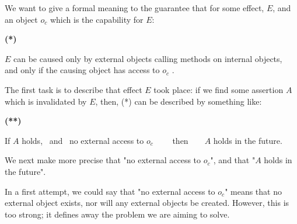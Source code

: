 We want to give a formal meaning to the guarantee that for some effect, $E$, and an object $o_c$ which is the capability for $E$:

\vspace{.1cm}

  \begin{minipage}{.05\textwidth}
   \textbf{(*)}
\end{minipage}
\hfill
\begin{minipage}{.95\textwidth}
\begin{flushleft}
$E$  can be caused only  by external objects calling methods on internal objects, \\
and only if the causing object has access  to $o_c$ . 
\end{flushleft}
\end{minipage}

\vspace{.1cm}


\noindent 
The first task is to describe that effect  $E$ took place: if we  find  some assertion $A$ 
which is invalidated by $E$, then, (*) can be described by something like:

\vspace{.1cm}

  \begin{minipage}{.05\textwidth}
   \textbf{(**)}
\end{minipage}
\hfill
\begin{minipage}{.95\textwidth}
\begin{flushleft}
If $A$ holds, \  and \     no external access to  $o_c$ \ \ \ \ then\  \ \  \ $A$ holds in the future. 
\end{flushleft}
\end{minipage}

\vspace{.1cm}


\noindent 
We next make more precise that "no external access to  $o_c$", and that "$A$ holds in the future".

In a first attempt, we could say that "no external access to  $o_c$" means  that no external object exists, nor will any external objects be created.
 However, this is too strong; it defines away the problem we are aiming to solve.

